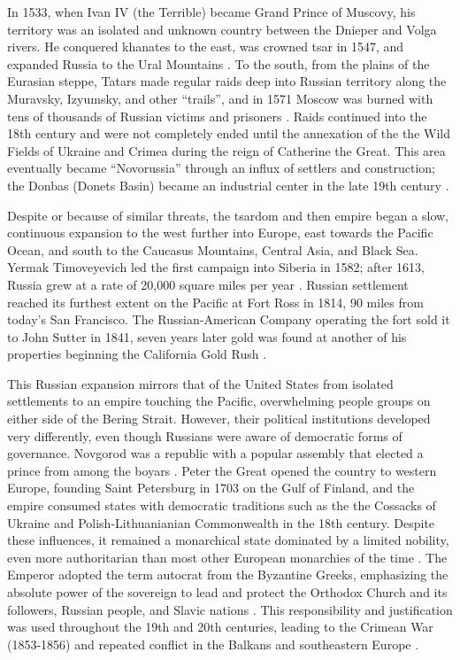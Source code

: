 In 1533, when Ivan IV (the Terrible) became Grand Prince of Muscovy, his territory was an isolated and unknown country between the Dnieper and Volga rivers.
He conquered khanates to the east, was crowned tsar in 1547, and expanded Russia to the Ural Mountains \cite[p.47-50]{bushkovitch2011}.
To the south, from the plains of the Eurasian steppe, Tatars made regular raids deep into Russian territory along the Muravsky, Izyumsky, and other ``trails'', and in 1571 Moscow was burned with tens of thousands of Russian victims and prisoners \cite[p.264-277]{madariaga2006}.
Raids continued into the 18th century and were not completely ended until the annexation of the the Wild Fields of Ukraine and Crimea during the reign of Catherine the Great. This area eventually became ``Novorussia'' through an influx of settlers and construction; the Donbas (Donets Basin) became an industrial center in the late 19th century \cite[p.109,122]{bushkovitch2011} \cite{sunderland2004}.

Despite or because of similar threats, the tsardom and then empire began a slow, continuous expansion to the west further into Europe, east towards the Pacific Ocean, and south to the Caucasus Mountains, Central Asia, and Black Sea.
Yermak Timoveyevich led the first campaign into Siberia in 1582; after 1613, Russia grew at a rate of 20,000 square miles per year \cite[p.53]{bushkovitch2011} \cite{montefiore2017}.
Russian settlement reached its furthest extent on the Pacific at Fort Ross in 1814, 90 miles from today's San Francisco.
The Russian-American Company operating the fort sold it to John Sutter in 1841, seven years later gold was found at another of his properties beginning the California Gold Rush \cite{parkman1996}.

This Russian expansion mirrors that of the United States from isolated settlements to an empire touching the Pacific, overwhelming people groups on either side of the Bering Strait.
However, their political institutions developed very differently, even though
Russians were aware of democratic forms of governance.
Novgorod was a republic with a popular assembly that elected a prince from among the boyars \cite[p.12]{bushkovitch2011}.
Peter the Great opened the country to western Europe, founding Saint Petersburg in 1703 on the Gulf of Finland, and the empire consumed states with democratic traditions  such as the the Cossacks of Ukraine and Polish-Lithuanianian Commonwealth in the 18th century.
Despite these influences, it remained a monarchical state dominated by a limited nobility, even more authoritarian than most other European monarchies of the time \cite[p.28, 65]{bushkovitch2011}.
The Emperor adopted the term autocrat from the Byzantine Greeks, emphasizing the absolute power of the sovereign to lead and protect the Orthodox Church and its followers, Russian people, and Slavic nations \cite[p. 39]{bushkovitch2011}.
This responsibility and justification was used throughout the 19th and 20th centuries, leading to the Crimean War (1853-1856) and repeated conflict in the Balkans and southeastern Europe \cite{montefiore2017}.

